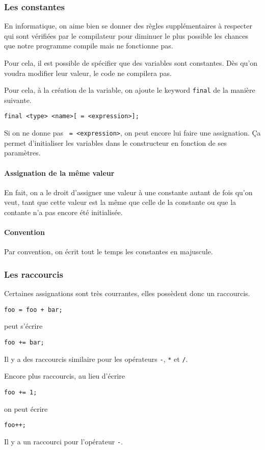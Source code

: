 \subsubsection{Les constantes}
En informatique, on aime bien se donner des règles supplémentaires à respecter
qui sont vérifiées par le compilateur pour diminuer le plus possible les
chances que notre programme compile mais ne fonctionne pas.

Pour cela, il est possible de spécifier que des variables sont constantes.
Dès qu'on voudra modifier leur valeur, le code ne compilera pas.

Pour cela, à la création de la variable, on ajoute le keyword \lstinline|final|
de la manière suivante.
\begin{lstlisting}
final <type> <name>[ = <expression>];
\end{lstlisting}
Si on ne donne pas \lstinline| = <expression>|, on peut encore lui faire une
assignation.
Ça permet d'initialiser les variables dans le constructeur en fonction
de ses paramètres.

\paragraph{Assignation de la même valeur}
En fait, on a le droit d'assigner une valeur à une constante autant de
fois qu'on veut, tant que cette valeur est la même que celle de la constante
ou que la contante n'a pas encore été initialisée.

\paragraph{Convention}
Par convention, on écrit tout le temps les constantes en majuscule.

\subsubsection{Les raccourcis}
Certaines assignations sont très courrantes, elles possèdent donc un raccourcis.
\begin{lstlisting}
foo = foo + bar;
\end{lstlisting}
peut s'écrire
\begin{lstlisting}
foo += bar;
\end{lstlisting}
Il y a des raccourcis similaire pour les opérateurs
\lstinline|-|, \lstinline|*| et \lstinline|/|.

Encore plus raccourcis, au lieu d'écrire
\begin{lstlisting}
foo += 1;
\end{lstlisting}
on peut écrire
\begin{lstlisting}
foo++;
\end{lstlisting}
Il y a un raccourci pour l'opérateur \lstinline|-|.

